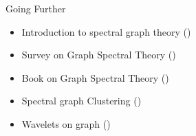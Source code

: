 \begin{textbox}{Going Further}
  \begin{itemize}
    \item Introduction to spectral graph theory (\cite{nica2016brief})
    \item Survey on Graph Spectral Theory (\cite{spielman2012spectral})

    \item Book on Graph Spectral Theory (\cite{chung1997spectral})
    \item Spectral graph Clustering (\cite{nascimento2011spectral})
    \item Wavelets on graph (\cite{hammond2011wavelets})

  \end{itemize}
\end{textbox}